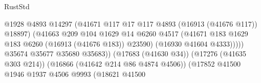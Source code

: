 \begin{lexlean}{RustStd}
\begin{coremodule}
                                                          @1928
                                                          @4893
                                                          @14297
                                                          (@41671
                                                            @117
                                                            @17
                                                            @117
                                                            @4893
                                                            (@16913 (@41676 @117))
                                                            @18897)
                                                          (@41663
                                                            @209
                                                            @104
                                                            @1629
                                                            @14
                                                            @6260
                                                            @4517
                                                            (@41671
                                                              @183
                                                              @1629
                                                              @183
                                                              @6260
                                                              (@16913 (@41676 @183))
                                                              @23590)
                                                            (@16930 @41604 @4333)))))
                                                    @35674
                                                    @35677
                                                    @35680
                                                    @35683))
                                                (@17683 (@41630 @34))
                                                (@17276 (@41635 @303 @214))
                                                (@16866 (@41642 @214 @86 @4874 @4506))
                                                (@17852
                                                  @41500
                                                  @1946
                                                  @1937
                                                  @4506
                                                  @9993
                                                  (@18621
                                                    @41500

\end{coremodule}
\end{lexlean}
